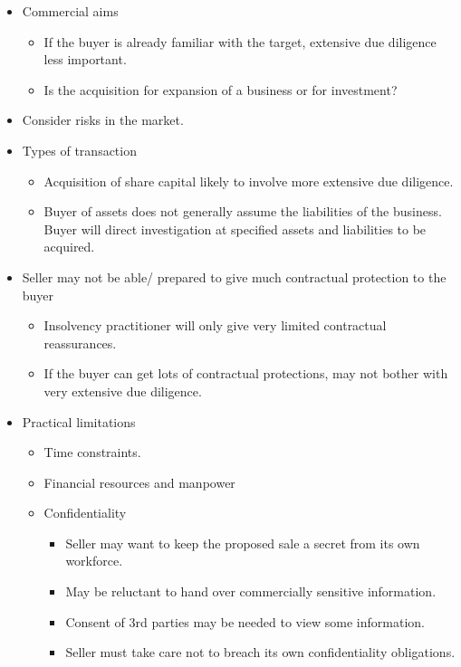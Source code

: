 \documentclass[
]{article}
\providecommand{\tightlist}{%
  \setlength{\itemsep}{0pt}\setlength{\parskip}{0pt}}
\begin{document}
\begin{itemize}
\tightlist
\item
  Commercial aims

  \begin{itemize}
  \tightlist
  \item
    If the buyer is already familiar with the target, extensive due
    diligence less important.
  \item
    Is the acquisition for expansion of a business or for investment?
  \end{itemize}
\item
  Consider risks in the market.
\item
  Types of transaction

  \begin{itemize}
  \tightlist
  \item
    Acquisition of share capital likely to involve more extensive due
    diligence.
  \item
    Buyer of assets does not generally assume the liabilities of the
    business. Buyer will direct investigation at specified assets and
    liabilities to be acquired.
  \end{itemize}
\item
  Seller may not be able/ prepared to give much contractual protection
  to the buyer

  \begin{itemize}
  \tightlist
  \item
    Insolvency practitioner will only give very limited contractual
    reassurances.
  \item
    If the buyer can get lots of contractual protections, may not bother
    with very extensive due diligence.
  \end{itemize}
\item
  Practical limitations

  \begin{itemize}
  \tightlist
  \item
    Time constraints.
  \item
    Financial resources and manpower
  \item
    Confidentiality

    \begin{itemize}
    \tightlist
    \item
      Seller may want to keep the proposed sale a secret from its own
      workforce.
    \item
      May be reluctant to hand over commercially sensitive information.
    \item
      Consent of 3rd parties may be needed to view some information.
    \item
      Seller must take care not to breach its own confidentiality
      obligations.
    \end{itemize}
  \end{itemize}
\end{itemize}
\end{document}
